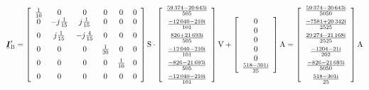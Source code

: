 \begin{exemple}
	\[
	\mcmplx{I}'\ped{B} =
	\begin{bmatrix}\begin{array}{cccccc}
			\frac{1}{10} & 0 & 0 & 0 & 0  & 0\\
			0 & -j\frac{1}{15} & j\frac{1}{15} & 0 & 0  & 0\\[2mm]
			0 & j\frac{1}{15} & -j\frac{4}{15} & 0 & 0  & 0\\[2mm]
			0 & 0 & 0 & \frac{1}{20} & 0  & 0\\[2mm]
			0 & 0 & 0 & 0 & \frac{1}{10} & 0\\[2mm]
			0 & 0 & 0 & 0 & 0 & 0
	\end{array}\end{bmatrix}\unit{S} \cdot
	\begin{bmatrix}\begin{array}{c}
			\frac{\complexnum{ 59374 - j 20643}}{505} \\[2mm]
			\frac{\complexnum{-12040 - j 210}}{101}  \\[2mm]
			\frac{\complexnum{826 + j 21693}}{505} \\[2mm]
			\frac{\complexnum{ -12040 - j 210}}{101}  \\[2mm]
			\frac{\complexnum{ -826 - j 21693}}{505} \\[2mm]
			\frac{\complexnum{ -12040 - j 210}}{101}
	\end{array}\end{bmatrix}\unit{V}
	+ \begin{bmatrix}\begin{array}{c}
				0 \\ 0 \\ 0 \\ 0 \\ 0 \\ \frac{\complexnum{518-j301}}{25}
	\end{array}\end{bmatrix}\unit{A} =
	\begin{bmatrix}\begin{array}{c}
			\frac{\complexnum{ 59374 - j 20643}}{5050} \\[2mm]
			\frac{\complexnum{-7581 + j 20342}}{2525}  \\[2mm]
			\frac{\complexnum{29274 - j 21168}}{2525} \\[2mm]
			\frac{\complexnum{-1204 - j 21}}{202}  \\[2mm]
			\frac{\complexnum{-826 - j 21693}}{5050} \\[2mm]
			\frac{\complexnum{518 - j 301}}{25}
	\end{array}\end{bmatrix}\unit{A}
	\]
	

\end{exemple}
